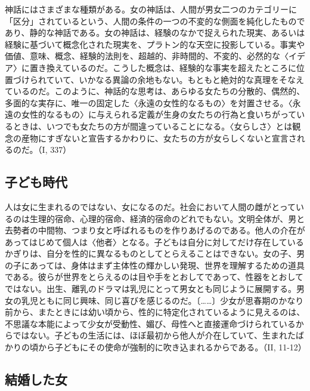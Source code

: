 神話にはさまざまな種類がある。女の神話は、人間が男女二つのカテゴリーに「区分」されているという、人間の条件の一つの不変的な側面を純化したものであり、静的な神話である。女の神話は、経験のなかで捉えられた現実、あるいは経験に基づいて概念化された現実を、プラトン的な天空に投影している。事実や価値、意味、概念、経験的法則を、超越的、非時間的、不変的、必然的な〈イデア〉に置き換えているのだ。こうした概念は、経験的な事実を超えたところに位置づけられていて、いかなる異論の余地もない。もともと絶対的な真理をそなえているのだ。このように、神話的な思考は、あらゆる女たちの分散的、偶然的、多面的な実存に、唯一の固定した〈永遠の女性的なるもの〉を対置させる。〈永遠の女性的なるもの〉に与えられる定義が生身の女たちの行為と食いちがっているときは、いつでも女たちの方が間違っていることになる。〈女らしさ〉とは観念の産物にすぎないと宣告するかわりに、女たちの方が女らしくないと宣言されるのだ。（I, 337）


\subsection{子ども時代}



人は女に生まれるのではない、女になるのだ。社会において人間の雌がとっているのは生理的宿命、心理的宿命、経済的宿命のどれでもない。文明全体が、男と去勢者の中間物、つまり女と呼ばれるものを作りあげるのである。他人の介在があってはじめて個人は〈他者〉となる。子どもは自分に対してだけ存在しているかぎりは、自分を性的に異なるものとしてとらえることはできない。女の子、男の子にあっては、身体はまず主体性の輝かしい発現、世界を理解するための道具である。彼らが世界をとらえるのは目や手をとおしてであって、性器をとおしてではない。出生、離乳のドラマは乳児にとって男女とも同じように展開する。男女の乳児ともに同じ興味、同じ喜びを感じるのだ。〔……〕少女が思春期のかなり前から、またときには幼い頃から、性的に特定化されているように見えるのは、不思議な本能によって少女が受動性、媚び、母性へと直接運命づけられているからではない。子どもの生活には、ほぼ最初から他人が介在していて、生まれたばかりの頃から子どもにその使命が強制的に吹き込まれるからである。（II, 11-12）

\subsection{結婚した女}


